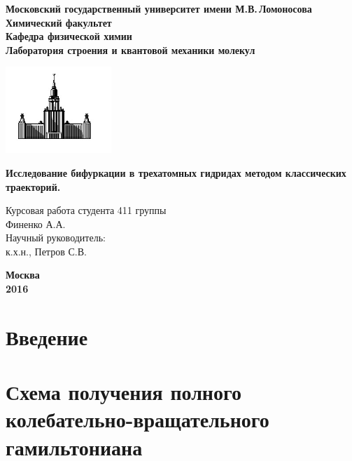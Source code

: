 \documentclass[12pt]{article}
\begin{document}
\begin{titlepage}
\centering
\textbf{\large Московский государственный университет имени М.В.\,Ломоносова\\
\vspace*{0.1cm} Химический факультет\\
\vspace*{0.1cm}
\noindent\makebox[\linewidth]{\rule{\paperwidth}{0.4pt}}
\vspace*{0.1cm}
 Кафедра физической химии\\
\vspace*{0.1cm} Лаборатория строения и квантовой механики молекул \\}
\vspace*{2cm}

\begin{center}
\includegraphics[width=0.3\textwidth]{pictures/logo.jpg}
\end{center}

\vspace*{2cm}
\Large \textbf{Исследование бифуркации в трехатомных гидридах методом классических траекторий.}
\vspace*{2cm}

\begin{flushright}
\large Курсовая работа студента 411 группы\\
Финенко А.А.\\
\vspace{1cm}
Научный руководитель:\\
к.х.н., Петров С.В.
\end{flushright}
\vfill
\large\textbf{Москва\\ 2016}
\end{titlepage}

\tableofcontents

\newpage

\section{Введение}

\section{Схема получения полного колебательно-вращательного гамильтониана}
\end{document}
